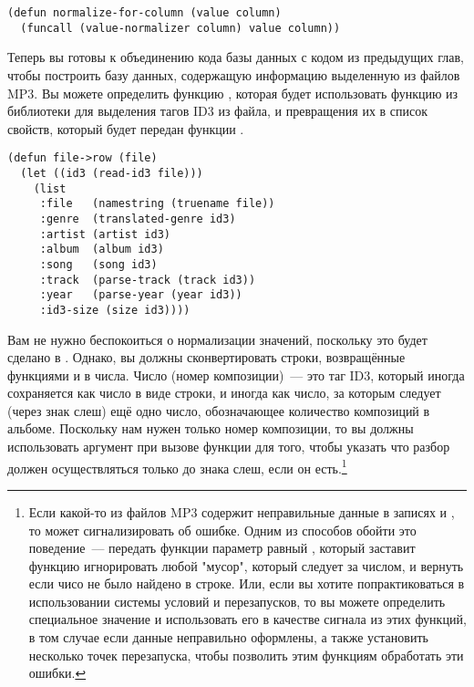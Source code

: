 \begin{lstlisting}
(defun normalize-for-column (value column)
  (funcall (value-normalizer column) value column))
\end{lstlisting}

Теперь вы готовы к объединению кода базы данных с кодом из предыдущих глав, чтобы
построить базу данных, содержащую информацию выделенную из файлов MP3.  Вы можете
определить функцию , которая будет использовать функцию  из
библиотеки  для выделения тагов ID3 из файла, и превращения их в список
свойств, который будет передан функции .

\begin{lstlisting}
(defun file->row (file)
  (let ((id3 (read-id3 file)))
    (list
     :file   (namestring (truename file))
     :genre  (translated-genre id3)
     :artist (artist id3)
     :album  (album id3)
     :song   (song id3)
     :track  (parse-track (track id3))
     :year   (parse-year (year id3))
     :id3-size (size id3))))
\end{lstlisting}

Вам не нужно беспокоиться о нормализации значений, поскольку это будет сделано в
.  Однако, вы должны сконвертировать строки, возвращённые функциями
 и  в числа.  Число  (номер композиции)~--- это таг ID3,
который иногда сохраняется как число в виде строки, и иногда как число, за которым следует
(через знак слеш) ещё одно число, обозначающее количество композиций в альбоме.  Поскольку
нам нужен только номер композиции, то вы должны использовать аргумент  при
вызове функции  для того, чтобы указать что разбор должен
осуществляться только до знака слеш, если он есть.\footnote{Если какой-то из файлов MP3
  содержит неправильные данные в записях  и , то
   может сигнализировать об ошибке. Одним из способов обойти это
  поведение~--- передать функции  параметр  равный
  , который заставит функцию игнорировать любой "мусор", который следует за
  числом, и вернуть  если чисо не было найдено в строке.  Или, если вы хотите
  попрактиковаться в использовании системы условий и перезапусков, то вы можете определить
  специальное значение  и использовать его в качестве сигнала из этих функций,
  в том случае если данные неправильно оформлены, а также установить несколько точек
  перезапуска, чтобы позволить этим функциям обработать эти ошибки.}


